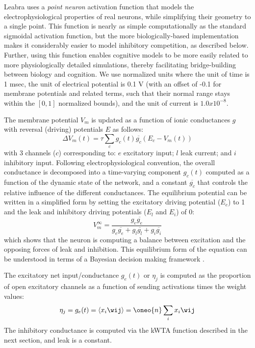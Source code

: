 Leabra uses a {\em point neuron} activation function that models the electrophysiological properties of real neurons, while simplifying their geometry to a single point. This function is nearly as simple computationally as the standard sigmoidal activation function, but the more biologically-based implementation makes it considerably easier to model inhibitory competition, as described below. Further, using this function enables cognitive models to be more easily related to more physiologically detailed simulations, thereby facilitating bridge-building between biology and cognition. We use normalized units where the unit of time is 1 msec, the unit of electrical potential is 0.1 V (with an offset of -0.1 for membrane potentials and related terms, such that their normal range stays within the $[0, 1]$ normalized bounds), and the unit of current is $1.0x10^{-8}$.

The membrane potential $V_m$ is updated as a function of ionic conductances $g$ with reversal (driving) potentials $E$ as follows:
\begin{equation}
 \Delta V_m(t) = \tau \sum_c g_c(t) \overline{g_c} (E_c - V_m(t))
 \label{eq.vm}
\end{equation}
with 3 channels ($c$) corresponding to: $e$ excitatory input; $l$ leak current; and $i$ inhibitory input. Following electrophysiological convention, the overall conductance is decomposed into a time-varying component $g_c(t)$ computed as a function of the dynamic state of the network, and a constant $\overline{g_c}$ that controls the relative influence of the different conductances. The equilibrium potential can be written in a simplified form by setting the excitatory driving potential ($E_e$) to 1 and the leak and inhibitory driving potentials ($E_l$ and $E_i$) of 0:
\begin{equation}
 V_m^\infty = \frac{g_e \overline{g_e}} {g_e
  \overline{g_e} + g_l \overline{g_l} + g_i \overline{g_i}} 
\end{equation}
which shows that the neuron is computing a balance between excitation and the opposing forces of leak and inhibition. This equilibrium form of the equation can be understood in terms of a Bayesian decision making framework \cite{OReillyMunakata00}.

The excitatory net input/conductance $g_e(t)$ or $\eta_j$ is computed as the proportion of open excitatory channels as a function of sending activations times the weight values:
\begin{equation}
 \eta_j = g_e(t) = \langle x_i \wij \rangle = \oneo{n} \sum_i x_i \wij
 \label{eq.net_in_avg}
\end{equation}
The inhibitory conductance is computed via the kWTA function described in the next section, and leak is a constant.

